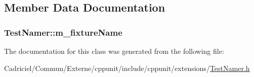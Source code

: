 \subsection{Member Data Documentation}
\hypertarget{class_test_namer_a02f9b6344602d27ef8095a54846e9307}{
\subsubsection[{m\-\_\-fixture\-Name}]{ Test\-Namer\-::m\-\_\-fixture\-Name\hspace{0.3cm}{\ttfamily [protected]}}}\label{class_test_namer_a02f9b6344602d27ef8095a54846e9307}


The documentation for this class was generated from the following file\-:\begin{DoxyCompactItemize}
\item 
Cadriciel/\-Commun/\-Externe/cppunit/include/cppunit/extensions/\hyperlink{_test_namer_8h}{Test\-Namer.\-h}\end{DoxyCompactItemize}
